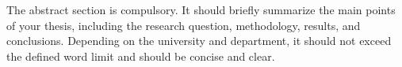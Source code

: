 \chapter{\abstractname}
The abstract section is compulsory. It should briefly summarize the main points of your thesis, including the research question, methodology, results, and conclusions. Depending on the university and department, it should not exceed the defined word limit and should be concise and clear.